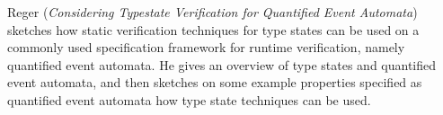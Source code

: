 

Reger
\cite{isola-2016-reger}
({\em Considering Typestate Verification for Quantified 
Event Automata})
sketches how static verification techniques for type states can be used on a commonly used specification framework for runtime verification, namely quantified event automata.
He gives an overview of type states and quantified event automata, and
then sketches on some example properties specified as quantified event
automata how type state techniques can be used.
